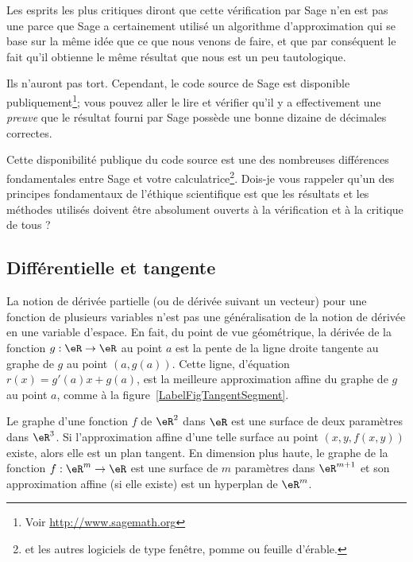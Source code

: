 \begin{remark}
	Les esprits les plus critiques diront que cette vérification par Sage n'en est pas une parce que Sage a certainement utilisé un algorithme d'approximation qui se base sur la même idée que ce que nous venons de faire, et que par conséquent le fait qu'il obtienne le même résultat que nous est un peu tautologique.

	Ils n'auront pas tort. Cependant, le code source de Sage est disponible publiquement\footnote{Voir \url{http://www.sagemath.org}}; vous pouvez aller le lire et vérifier qu'il y a effectivement une \emph{preuve} que le résultat fourni par Sage possède une bonne dizaine de décimales correctes.

	Cette disponibilité publique du code source est une des nombreuses différences fondamentales entre Sage et votre calculatrice\footnote{et les autres logiciels de type fenêtre, pomme ou feuille d'érable.}. Dois-je vous rappeler qu'un des principes fondamentaux de l'éthique scientifique est que les résultats et les méthodes utilisés doivent être absolument ouverts à la vérification et à la critique de tous ?
\end{remark}

\subsection{Différentielle et tangente}

La notion de dérivée partielle (ou de dérivée suivant un vecteur) pour une fonction de plusieurs variables n'est pas une  généralisation de la notion de dérivée en une variable d'espace. En fait, du point de vue géométrique, la dérivée de la fonction \( g:\eR\to\eR\) au point \( a\) est la pente de la ligne droite tangente au graphe de \( g\) au point \( (a, g(a))\). Cette ligne, d'équation \( r(x)=g'(a)x+g(a)\), est la meilleure approximation affine du graphe de \( g\) au point \( a\), comme à la figure~\ref{LabelFigTangentSegment}.
\newcommand{\CaptionFigTangentSegment}{Tangentes au graphe d'une fonction d'une variable}


Le graphe d'une fonction \( f\) de \( \eR^2\) dans \( \eR\) est une surface de deux paramètres dans \( \eR^3\). Si l'approximation affine d'une telle surface au point \( (x,y,f(x,y))\) existe, alors elle est un plan tangent. En dimension plus haute, le graphe de la fonction \( f:\eR^m\to\eR\) est une surface de \( m\) paramètres dans \( \eR^{m+1}\) et son approximation affine (si elle existe) est un hyperplan de \( \eR^m\).

